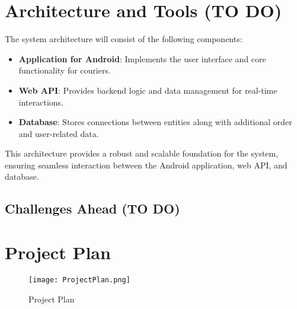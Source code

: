 \documentclass[a4paper,twoside,11pt]{article}
\begin{document}
\section*{Architecture and Tools (TO DO)}

The system architecture will consist of the following components:

\begin{itemize}
\item \textbf{Application for Android}: Implements the user interface and core functionality for couriers.
\item \textbf{Web API}: Provides backend logic and data management for real-time interactions.
\item \textbf{Database}: Stores connections between entities along with additional order and user-related data.
\end{itemize}

This architecture provides a robust and scalable foundation for the system, ensuring seamless interaction between the Android application, web API, and database.

\subsection*{Challenges Ahead (TO DO)}

\newpage

\section*{Project Plan}

\begin{figure}[h]
    \centering
    \texttt{[image: ProjectPlan.png]}
    \caption{Project Plan}
    \label{fig:project-plan}
\end{figure}



\end{document}
